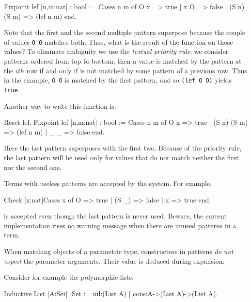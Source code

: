\begin{coq_example}
Fixpoint lef [n,m:nat] : bool :=
         Cases n m of
             O     x     => true 
          |  x     O     => false 
          | (S n) (S m)  => (lef n m)
         end.
\end{coq_example}

Note that the first and the second multiple pattern superpose because
the couple of values \texttt{O O} matches both. Thus, what is the result
of the function on those values?  To eliminate ambiguity we use the
{\em textual priority rule}: we consider patterns ordered from top to
bottom, then a value is matched by the pattern at the $ith$ row if and
only if is not matched by some pattern of a previous row. Thus in the
example,
\texttt{O O} is matched by the first pattern, and so \texttt{(lef O O)}
yields \texttt{true}.

Another way to write  this function is:

\begin{coq_example}
Reset lef.
Fixpoint lef [n,m:nat] : bool :=
         Cases n m of
             O     x    => true  
          | (S n) (S m) => (lef n m)
          |  _     _    => false
         end.
\end{coq_example}


Here the last pattern superposes with the first two. Because
of the priority rule, the last pattern 
will be used only for values that do not match neither the  first nor
the second one.  

Terms with useless patterns are accepted by the
system. For example,
\begin{coq_example}
Check [x:nat]Cases x of O => true | (S _) => false | x => true end.
\end{coq_example}

is accepted even though the last pattern is never used.
Beware,  the
current implementation rises no warning message when there are unused
patterns in a term.



When matching objects of a parametric type, constructors in patterns
{\em do not expect} the parameter arguments. Their value is deduced
during expansion.

Consider for example the polymorphic lists:

\begin{coq_example}
Inductive List [A:Set] :Set := 
  nil:(List A) 
| cons:A->(List A)->(List A).
\end{coq_example}

